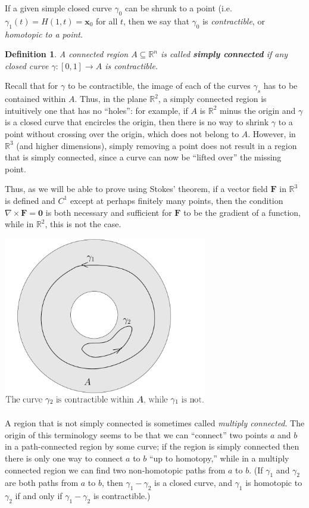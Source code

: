 \documentclass[12pt,letterpaper]{article}
\newtheorem{definition}[theorem]{Definition}
\newcommand{\R}{\mathbb{R}}
\newcommand{\x}{\mathbf{x}}
\begin{document}
If a given simple closed curve $\gamma_0$ can be shrunk to a point (i.e. $\gamma_1(t) = H(1,t) = \x_0$ for all $t$, then we say that $\gamma_0$ is {\em contractible}, or {\em homotopic to a point}.
\begin{definition}
A connected region $A\subseteq \R^n$ is called {\bf simply connected} if any closed curve $\gamma:[0,1]\to A$ is contractible.
\end{definition}
Recall that for $\gamma$ to be contractible, the image of each of the curves $\gamma_s$ has to be contained within $A$.  Thus, in the plane $\R^2$, a simply connected region is intuitively one that has no ``holes'': for example, if $A$ is $\R^2$ minus the origin and $\gamma$ is a closed curve that encircles the origin, then there is no way to shrink $\gamma$ to a point without crossing over the origin, which does not belong to $A$. However, in $\R^3$ (and higher dimensions), simply removing a point does not result in a region that is simply connected, since a curve can now be ``lifted over'' the missing point.

Thus, as we will be able to prove using Stokes' theorem, if a vector field $\mathbf{F}$ in $\R^3$ is defined and $C^1$ except at perhaps finitely many points, then the condition $\nabla\times\mathbf{F}=\mathbf{0}$ is both necessary and sufficient for $\mathbf{F}$ to be the gradient of a function, while in $\R^2$, this is not the case.
\begin{center}
\includegraphics[width=3.5in]{simple.pdf}
\end{center}
A region that is not simply connected is sometimes called {\em multiply connected}.  The origin of this terminology seems to be that we can ``connect'' two points $a$ and $b$ in a path-connected region by some curve; if the region is simply connected then there is only one way to connect $a$ to $b$ ``up to homotopy,'' while in a multiply connected region we can find two non-homotopic paths from $a$ to $b$.  (If $\gamma_1$ and $\gamma_2$ are both paths from $a$ to $b$, then $\gamma_1-\gamma_2$ is a closed curve, and $\gamma_1$ is homotopic to $\gamma_2$ if and only if $\gamma_1-\gamma_2$ is contractible.) 
\end{document}
